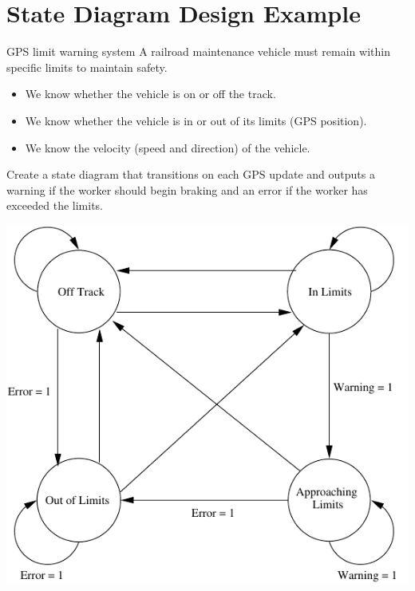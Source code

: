\section{State Diagram Design Example}

\begin{frame}{GPS limit warning system}
  A railroad maintenance vehicle must remain within specific limits to maintain safety.
  \begin{itemize}
    \item We know whether the vehicle is on or off the track.
    \item We know whether the vehicle is in or out of its limits (GPS position).
    \item We know the velocity (speed and direction) of the vehicle.
  \end{itemize}
  Create a state diagram that transitions on each GPS update and outputs a warning if the worker should begin braking and an error if the worker has exceeded the limits.
\end{frame}

\includegraphics{GPSLimitWarningStateDiagram}


